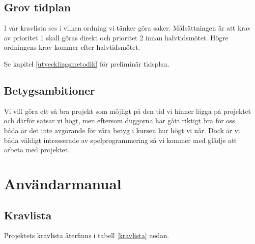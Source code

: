 \documentclass{scrartcl}
\begin{document}
\subsection{Grov tidplan}
I vår kravlista ses i vilken ordning vi tänker göra saker. Målsättningen är att krav av prioritet 1 skall göras direkt och prioritet 2 innan halvtidsmötet. Högre ordningens krav kommer efter halvtidsmötet.

Se kapitel \ref{utvecklingsmetodik} för preliminär tidsplan.

\subsection{Betygsambitioner}
Vi vill göra ett så bra projekt som möjligt på den tid vi hinner lägga på projektet och därför satsar vi högt, men eftersom duggorna har gått riktigt bra för oss båda är det inte avgörande för våra betyg i kursen hur högt vi når. Dock är vi båda väldigt intresserade av spelprogrammering så vi kommer med glädje att arbeta med projektet.

\section{Användarmanual}

\subsection{Kravlista}
Projektets kravlista återfinns i tabell \ref{kravlista} nedan.
\end{document}
